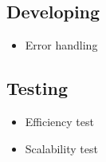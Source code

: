 \documentclass[11pt,a4paper,landscape]{article}
\begin{document}
\subsection*{Developing}
\begin{itemize}
\item Error handling
\end{itemize}

\subsection*{Testing}
\begin{itemize}
\item Efficiency test
\item Scalability test
\end{itemize}
\end{document}
